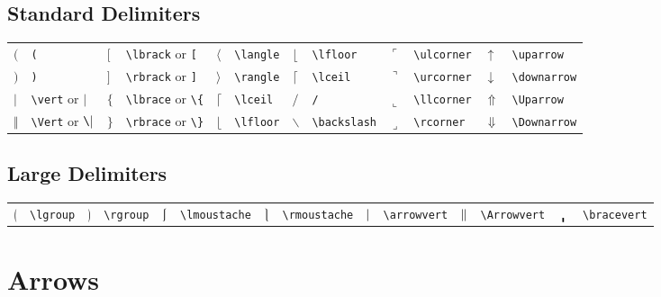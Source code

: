 \documentclass[10pt, english]{article}
\begin{document}
	\subsection{Standard Delimiters}

	\begin{center}
		\scriptsize
	\begin{tabular}{ll|ll|ll|ll|ll|ll}
		$($ & \verb|(| & $\lbrack$ & \verb|\lbrack| or \verb|[| & $\langle$ & \verb|\langle| & $\lfloor$ & \verb|\lfloor| & $\ulcorner$ & \verb|\ulcorner| & $\uparrow$ & \verb|\uparrow| \\
		$)$ & \verb|)| & $\rbrack$ & \verb|\rbrack| or \verb|]| & $\rangle$ & \verb|\rangle| & $\lceil$ & \verb|\lceil| & $\urcorner$ & \verb|\urcorner| & $\downarrow$ & \verb|\downarrow| \\
		$\vert$ & \verb|\vert| or $\mathtt{|}$ & $\lbrace$ & \verb|\lbrace| or \verb|\{| & $\lceil$ & \verb|\lceil| & $/$ & \verb|/| & $\llcorner$ & \verb|\llcorner| & $\Uparrow$ & \verb|\Uparrow| \\
		$\Vert$ & \verb|\Vert| or $\verb|\||$ & $\rbrace$ & \verb|\rbrace| or \verb|\}| & $\lfloor$ & \verb|\lfloor| & $\backslash$ & \verb|\backslash| & $\lrcorner$ & \verb|\rcorner| & $\Downarrow$ & \verb|\Downarrow| \\
	\end{tabular}
	\end{center}

	\subsection{Large Delimiters}

	\begin{center}
		\scriptsize
	\begin{tabular}{ll|ll|ll|ll|ll|ll|ll}
		$\lgroup$ & \verb|\lgroup| & $\rgroup$ & \verb|\rgroup| & $\lmoustache$ & \verb|\lmoustache| & $\rmoustache$ & \verb|\rmoustache| & $\arrowvert$ & \verb|\arrowvert| & $\Arrowvert$ & \verb|\Arrowvert| & $\bracevert$ & \verb|\bracevert| \\
	\end{tabular}
	\end{center}

\section{Arrows}	
\end{document}
